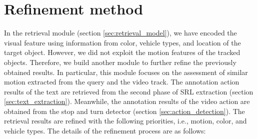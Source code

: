 \section{Refinement method}
\label{sec:refinement}
In the retrieval module (section \ref{sec:retrieval_model}), we have encoded the visual feature using information from color, vehicle types, and location of the target object. However, we did not exploit the motion features of the tracked objects. Therefore, we build another module to further refine the previously obtained results. In particular, this module focuses on the assessment of similar motion extracted from the query and the video track. The annotation action results of the text are retrieved from the second phase of SRL extraction (section \ref{sec:text_extraction}). Meanwhile, the annotation results of the video action are obtained from the stop and turn detector (section \ref{sec:action_detection}). The retrieval results are refined with the following priorities, i.e., motion, color, and vehicle types. The details of the refinement process are as follows:

